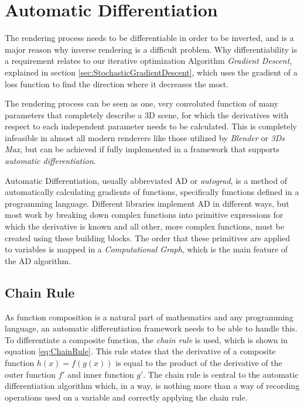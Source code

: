 \section{Automatic Differentiation}\label{sec:AutomaticDifferentiation}

The rendering process needs to be differentiable in order to be inverted, and is a major reason why inverse rendering is a difficult problem. Why differentiability is a requirement relates to our iterative optimization Algorithm \textit{Gradient Descent}, explained in section \ref{sec:StochasticGradientDescent}, which uses the gradient of a loss function to find the direction where it decreases the most.

The rendering process can be seen as one, very convoluted function of many parameters that completely describe a 3D scene, for which the derivatives with respect to each independent parameter needs to be calculated. This is completely infeasible in almost all modern renderers like those utilized by \textit{Blender} or \textit{3Ds Max}, but can be achieved if fully implemented in a framework that supports \textit{automatic differentiation}.

Automatic Differentiation, usually abbreviated AD or \textit{autograd}, is a method of automatically calculating gradients of functions, specifically functions defined in a programming language. Different libraries implement AD in different ways, but most work by breaking down complex functions into primitive expressions for which the derivative is known and all other, more complex functions, must be created using these building blocks. The order that these primitives are applied to variables is mapped in a \textit{Computational Graph}, which is the main feature of the AD algorithm. 

\subsection{Chain Rule}\label{sec:ChainRule}

As function composition is a natural part of mathematics and any programming language, an automatic differentiation framework needs to be able to handle this. To differentiate a composite function, the \textit{chain rule} is used, which is shown in equation \ref{eq:ChainRule}. This rule states that the derivative of a composite function $h(x) = f(g(x))$ is equal to the product of the derivative of the outer function $f'$ and inner function $g'$. The chain rule is central to the automatic differentiation algorithm which, in a way, is nothing more than a way of recording operations used on a variable and correctly applying the chain rule.



